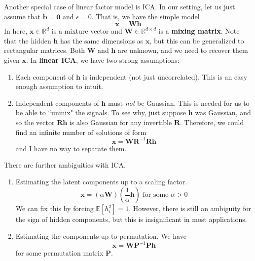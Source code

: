   Another special case of linear factor model is ICA. In our setting, let us just assume that $\mathbf{b} = \mathbf{0}$ and $\epsilon = 0$. That is, we have the simple model 
  \begin{equation}
    \mathbf{x} = \mathbf{W} \mathbf{h}
  \end{equation}
  In here, $\mathbf{x} \in \mathbb{R}^d$ is a mixture vector and $\mathbf{W} \in \mathbb{R}^{d \times d}$ is a \textbf{mixing matrix}. Note that the hidden $\mathbf{h}$ has the same dimensions as $\mathbf{x}$, but this can be generalized to rectangular matrices. Both $\mathbf{W}$ and $\mathbf{h}$ are unknown, and we need to recover them given $\mathbf{x}$. In \textbf{linear ICA}, we have two strong assumptions: 
  \begin{enumerate} 
    \item Each component of $\mathbf{h}$ is independent (not just uncorrelated). This is an easy enough assumption to intuit.  
    \item Independent components of $\mathbf{h}$ must \textit{not} be Gaussian. This is needed for us to be able to ``unmix" the signals. To see why, just suppose $\mathbf{h}$ was Gaussian, and so the vector $\mathbf{R} \mathbf{h}$ is also Gaussian for any invertible $\mathbf{R}$. Therefore, we could find an infinite number of solutions of form 
    \begin{equation}
      \mathbf{x} = \mathbf{W} \mathbf{R}^{-1} \mathbf{R} \mathbf{h}
    \end{equation}
    and I have no way to separate them. 
  \end{enumerate}

  There are further ambiguities with ICA. 
  \begin{enumerate}
    \item Estimating the latent components up to a scaling factor. 
    \begin{equation}
      \mathbf{x} = (\alpha \mathbf{W}) (\frac{1}{\alpha} \mathbf{h}) \text{ for some } \alpha > 0
    \end{equation}
    We can fix this by forcing $\mathbb{E}[h_i^2] = 1$. However, there is still an ambiguity for the sign of hidden components, but this is insignificant in most applications. 

    \item Estimating the components up to permutation. We have 
    \begin{equation}
      \mathbf{x} = \mathbf{W} \mathbf{P}^{-1} \mathbf{P} \mathbf{h}
    \end{equation}
    for some permutation matrix $\mathbf{P}$. 
  \end{enumerate}

